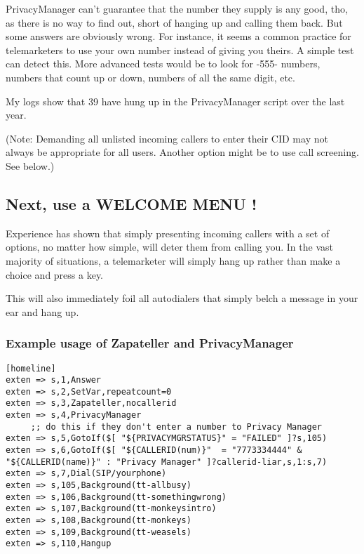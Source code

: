 PrivacyManager can't guarantee that the number they supply is any
good, tho, as there is no way to find out, short of hanging up and
calling them back. But some answers are obviously wrong. For instance,
it seems a common practice for telemarketers to use your own number
instead of giving you theirs. A simple test can detect this. More
advanced tests would be to look for -555- numbers, numbers that count
up or down, numbers of all the same digit, etc.

My logs show that 39 have hung up in the PrivacyManager script over
the last year.

(Note: Demanding all unlisted incoming callers to enter their CID may
not always be appropriate for all users. Another option might be to
use call screening. See below.)


\subsection{Next, use a WELCOME MENU !}

Experience has shown that simply presenting incoming callers with
a set of options, no matter how simple, will deter them from calling
you. In the vast majority of situations, a telemarketer will simply
hang up rather than make a choice and press a key.

This will also immediately foil all autodialers that simply belch a
message in your ear and hang up.

\subsubsection{Example usage of Zapateller and PrivacyManager}

\begin{astlisting}
\begin{verbatim}
[homeline]
exten => s,1,Answer
exten => s,2,SetVar,repeatcount=0
exten => s,3,Zapateller,nocallerid
exten => s,4,PrivacyManager
     ;; do this if they don't enter a number to Privacy Manager
exten => s,5,GotoIf($[ "${PRIVACYMGRSTATUS}" = "FAILED" ]?s,105)
exten => s,6,GotoIf($[ "${CALLERID(num)}"  = "7773334444" & "${CALLERID(name)}" : "Privacy Manager" ]?callerid-liar,s,1:s,7)
exten => s,7,Dial(SIP/yourphone)
exten => s,105,Background(tt-allbusy)
exten => s,106,Background(tt-somethingwrong)
exten => s,107,Background(tt-monkeysintro)
exten => s,108,Background(tt-monkeys)
exten => s,109,Background(tt-weasels)
exten => s,110,Hangup
\end{verbatim}
\end{astlisting}

